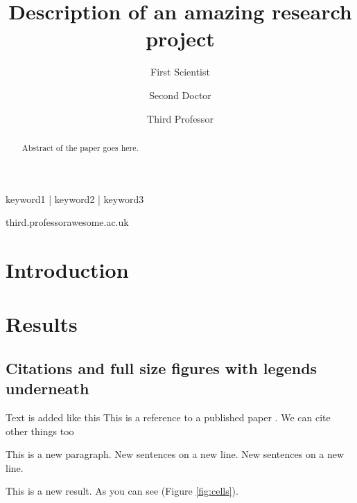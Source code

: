 \documentclass[submit]{theme/bioRxiv}
\begin{document}

\title{Description of an amazing research project}

\author[1]{First Scientist }
\author[2]{Second Doctor }
\author[1,\Letter]{Third Professor }
\date{}

\maketitle

\begin{abstract}
Abstract of the paper goes here.
\lipsum[1]
\end{abstract}

\begin{keywords}
keyword1 | keyword2 | keyword3
\end{keywords}

\begin{corrauthor}
third.professor\at awesome.ac.uk
\end{corrauthor}

\section*{Introduction}\label{s:introduction}


\section*{Results}\label{s:results}

\subsection*{Citations and full size figures with legends underneath}

Text is added like this
This is a reference to a published paper \citep{watson_molecular_1953}.
We can cite other things too \citep{tipton_complexities_2019,zheng_genome_2011,alberts_molecular_2002}

This is a new paragraph.
New sentences on a new line.
New sentences on a new line.

This is a new result.
As you can see (Figure \ref{fig:cells}).
\end{document}
